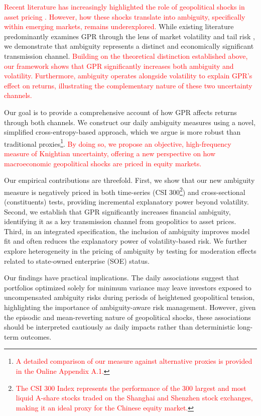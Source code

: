\documentclass[preprint,12pt,authoryear]{elsarticle}
\begin{document}
\textcolor{red}{Recent literature has increasingly highlighted the role of geopolitical shocks in asset pricing \citep{zhangGeopoliticalRiskExposure2024}. However, how these shocks translate into ambiguity, specifically within emerging markets, remains underexplored.} While existing literature predominantly examines GPR through the lens of market volatility \citep{Liu2024} and tail risk \citep{Salisu2021}, we demonstrate that ambiguity represents a distinct and economically significant transmission channel. \textcolor{red}{Building on the theoretical distinction established above, our framework shows that GPR significantly increases both ambiguity and volatility. Furthermore, ambiguity operates alongside volatility to explain GPR's effect on returns, illustrating the complementary nature of these two uncertainty channels.}

Our goal is to provide a comprehensive account of how GPR affects returns through both channels. We construct our daily ambiguity measures using a novel, simplified cross-entropy-based approach, which we argue is more robust than traditional proxies\footnote{\textcolor{red}{A detailed comparison of our measure against alternative proxies is provided in the Online Appendix A.1.}}. \textcolor{red}{By doing so, we propose an objective, high-frequency measure of Knightian uncertainty, offering a new perspective on how macroeconomic geopolitical shocks are priced in equity markets.}

Our empirical contributions are threefold. First, we show that our new ambiguity measure is negatively priced in both time-series (CSI 300\footnote{\textcolor{red}{The CSI 300 Index represents the performance of the 300 largest and most liquid A-share stocks traded on the Shanghai and Shenzhen stock exchanges, making it an ideal proxy for the Chinese equity market.}}) and cross-sectional (constituents) tests, providing incremental explanatory power beyond volatility. Second, we establish that GPR significantly increases financial ambiguity, identifying it as a key transmission channel from geopolitics to asset prices. Third, in an integrated specification, the inclusion of ambiguity improves model fit and often reduces the explanatory power of volatility-based risk. We further explore heterogeneity in the pricing of ambiguity by testing for moderation effects related to state-owned enterprise (SOE) status.

Our findings have practical implications. The daily associations suggest that portfolios optimized solely for minimum variance may leave investors exposed to uncompensated ambiguity risks during periods of heightened geopolitical tension, highlighting the importance of ambiguity-aware risk management. However, given the episodic and mean-reverting nature of geopolitical shocks, these associations should be interpreted cautiously as daily impacts rather than deterministic long-term outcomes.
\end{document}
